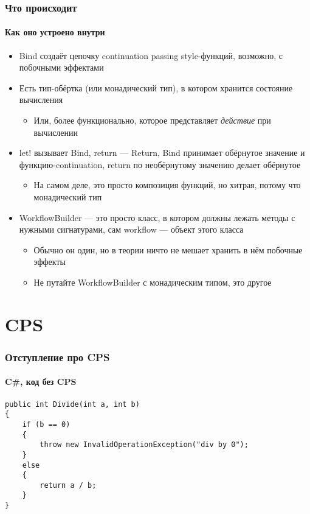\documentclass{../../slides-style}
\begin{document}
    \begin{frame}
        \frametitle{Что происходит}
        \framesubtitle{Как оно устроено внутри}
        \begin{itemize}
            \item Bind создаёт цепочку continuation passing style-функций, возможно, с побочными эффектами
            \item Есть тип-обёртка (или монадический тип), в котором хранится состояние вычисления
            \begin{itemize}
                \item Или, более функционально, которое представляет \emph{действие} при вычислении
            \end{itemize}
            \item let! вызывает Bind, return --- Return, Bind принимает обёрнутое значение и функцию-continuation, return по необёрнутому значению делает обёрнутое
            \begin{itemize}
                \item На самом деле, это просто композиция функций, но хитрая, потому что монадический тип
            \end{itemize} 
            \item WorkflowBuilder --- это просто класс, в котором должны лежать методы с нужными сигнатурами, сам workflow --- объект этого класса
            \begin{itemize}
                \item Обычно он один, но в теории ничто не мешает хранить в нём побочные эффекты
                \item Не путайте WorkflowBuilder с монадическим типом, это другое
            \end{itemize}
        \end{itemize}
    \end{frame}

    \section{CPS}

    \begin{frame}[fragile]
        \frametitle{Отступление про CPS}
        \framesubtitle{C\#, код без CPS}
        \begin{verbatim}
public int Divide(int a, int b)
{
    if (b == 0)
    {
        throw new InvalidOperationException("div by 0");
    }
    else
    {
        return a / b;
    }
}
        \end{verbatim}
    \end{frame}
\end{document}
